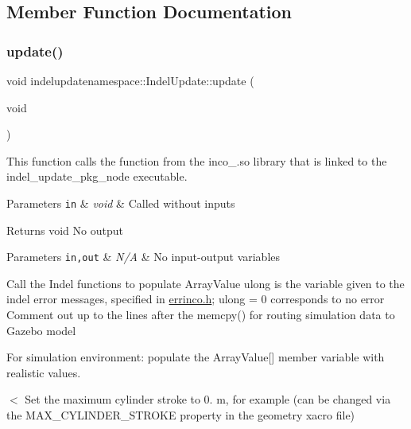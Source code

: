 \subsection{Member Function Documentation}
\mbox{\label{classindelupdatenamespace_1_1IndelUpdate_a090a97f692782ed532921bf2eeab8ae4}} 
\subsubsection{\texorpdfstring{update()}{update()}}
{\footnotesize\ttfamily void indelupdatenamespace\+::\+Indel\+Update\+::update (\begin{DoxyParamCaption}\item[{void}]{ }\end{DoxyParamCaption})}



This function calls the function from the inco\+\_.\+so library that is linked to the indel\+\_\+update\+\_\+pkg\+\_\+node executable. 


\begin{DoxyParams}[1]{Parameters}
\mbox{\tt in}  & {\em void} & Called without inputs \\
\hline
\end{DoxyParams}
\begin{DoxyReturn}{Returns}
void No output 
\end{DoxyReturn}

\begin{DoxyParams}[1]{Parameters}
\mbox{\tt in,out}  & {\em N/A} & No input-\/output variables \\
\hline
\end{DoxyParams}
Call the Indel functions to populate Array\+Value ulong is the variable given to the indel error messages, specified in \hyperlink{errinco_8h}{errinco.\+h}; ulong = 0 corresponds to no error Comment out up to the lines after the memcpy() for routing simulation data to Gazebo model

For simulation environment\+: populate the Array\+Value\mbox{[}\mbox{]} member variable with realistic values.

$<$ Set the maximum cylinder stroke to 0. m, for example (can be changed via the M\+A\+X\+\_\+\+C\+Y\+L\+I\+N\+D\+E\+R\+\_\+\+S\+T\+R\+O\+KE property in the geometry xacro file) 

